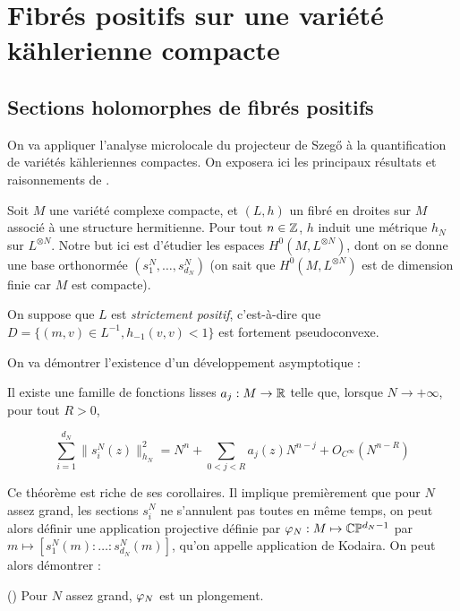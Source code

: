 \section{Fibrés positifs sur une variété kählerienne compacte}

\subsection{Sections holomorphes de fibrés positifs}

On va appliquer l'analyse microlocale du projecteur de Szeg\H{o} à la quantification de variétés kähleriennes compactes. On exposera ici les principaux résultats et raisonnements de \cite{Zelditch2000}.

Soit $M$ une variété complexe compacte, et $(L,h)$ un fibré en droites sur $M$ associé à une structure hermitienne. Pour tout $n \in \mathbb{Z}$, $h$ induit une métrique $h_N$ sur $L^{\otimes N}$. Notre but ici est d'étudier les espaces $H^0(M,L^{\otimes N})$, dont on se donne une base orthonormée $(s^N_1, \ldots, s^N_{d_N})$ (on sait que $H^0(M,L^{\otimes N})$ est de dimension finie car $M$ est compacte).

On suppose que $L$ est \emph{strictement positif}, c'est-à-dire que $D=\{(m,v) \in L^{-1}, h_{-1}(v,v) < 1\}$ est fortement pseudoconvexe. 

On va démontrer l'existence d'un développement asymptotique :

\begin{theorem}[Zelditch] Il existe une famille de fonctions lisses $a_j : M \to \mathbb{R}$ telle que, lorsque $N \to +\infty$, pour tout $R>0$,  

\begin{equation*}
	\sum_{i=1}^{d_N}\|s^N_i(z)\|^2_{h_N} = N^n + \sum_{0 < j < R} a_j(z)N^{n-j} + O_{C^{\infty}}(N^{n-R})
\end{equation*}
\end{theorem}

Ce théorème est riche de ses corollaires. Il implique premièrement que pour $N$ assez grand, les sections $s^N_i$ ne s'annulent pas toutes en même temps, on peut alors définir une application projective définie par $\varphi_N : M \mapsto \mathbb{C}\mathbb{P}^{d_N-1}$ par $m \mapsto [s^N_1(m) : \ldots : s^N_{d_N}(m)]$, qu'on appelle application de Kodaira. On peut alors démontrer :

\begin{theorem}[Kodaira] (\cite{fritzsche}) Pour $N$ assez grand, $\varphi_N$ est un plongement. \end{theorem}


